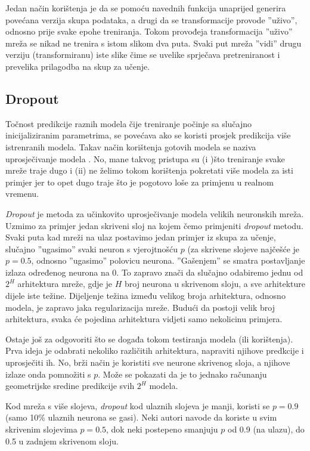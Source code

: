 \documentclass[times, utf8, diplomski, numeric]{fer}
\begin{document}
Jedan način korištenja je da se pomoću navednih funkcija unaprijed generira povećana verzija skupa podataka, a drugi da se transformacije provode ''uživo'', odnosno prije svake epohe treniranja. Tokom provođeja transformacija ''uživo'' mreža se nikad ne trenira s istom slikom dva puta. Svaki put mreža ''vidi'' drugu verziju (transformiranu) iste slike čime se uvelike sprječava pretreniranost i prevelika prilagodba na skup za učenje.

\subsection{Dropout}

Točnost predikcije raznih modela čije treniranje počinje sa slučajno inicijaliziranim parametrima, se povećava ako se koristi prosjek predikcija više istrenranih modela. Takav način korištenja gotovih modela se naziva uprosječivanje modela . No, mane takvog pristupa su (i )što treniranje svake mreže traje dugo i (ii) ne želimo tokom korištenja pokretati više modela za isti primjer jer to opet dugo traje što je pogotovo loše za primjenu u realnom vremenu.

\emph{Dropout} je metoda za učinkovito uprosječivanje modela velikih neuronskih mreža\cite{hinton_dropout}. Uzmimo za primjer jedan skriveni sloj na kojem čemo primjeniti \emph{dropout} metodu. Svaki puta kad mreži na ulaz postavimo jedan primjer iz skupa za učenje, slučajno ''ugasimo'' svaki neuron s vjerojtnošću $p$ (za skrivene slojeve najčešće je $p = 0.5$, odnosno ''ugasimo'' polovicu neurona. ''Gašenjem'' se smatra postavljanje izlaza određenog neurona na 0. To zapravo znači da slučajno odabiremo jednu od $2^H$ arhitektura mreže, gdje je $H$ broj neurona u skrivenom sloju, a sve arhitekture dijele iste težine. Dijeljenje težina između velikog broja arhitektura, odnosno modela, je zapravo jaka regularizacija mreže. Budući da postoji velik broj arhitektura, svaka će pojedina arhitektura vidjeti samo nekolicinu primjera.

Ostaje još za odgovoriti što se događa tokom testiranja modela (ili korištenja). Prva ideja je odabrati nekoliko različitih arhitektura, napraviti njihove predkcije i uprosječiti ih. No, brži način je koristiti sve neurone skrivenog sloja, a njihove izlaze onda pomnožiti s $p$. Može se pokazati da je to jednako računanju geometrijske sredine predikcije svih $2^H$ modela.

Kod mreža s više slojeva, \emph{dropout} kod ulaznih slojeva je manji, koristi se $p = 0.9$ (samo 10\% ulaznih neurona se gasi). Neki autori navode da koriste u svim skrivenim slojevima $p = 0.5$, dok neki postepeno smanjuju $p$ od 0.9 (na ulazu), do 0.5 u zadnjem skrivenom sloju.
\end{document}

